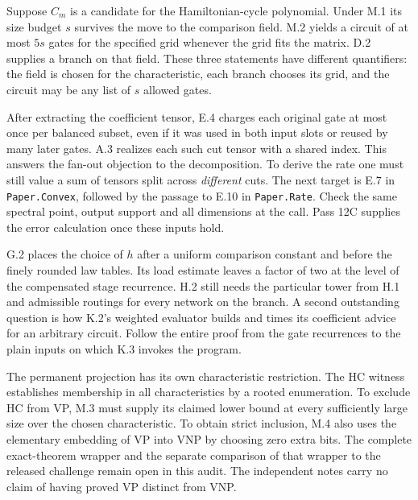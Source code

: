 \newpage
{}
Suppose $C_m$ is a candidate for the Hamiltonian-cycle polynomial. Under M.1 its size budget $s$ survives the move to the comparison field. M.2 yields a circuit of at most $5s$ gates for the specified grid whenever the grid fits the matrix. D.2 supplies a branch on that field. These three statements have different quantifiers: the field is chosen for the characteristic, each branch chooses its grid, and the circuit may be any list of $s$ allowed gates.

After extracting the coefficient tensor, E.4 charges each original gate at most once per balanced subset, even if it was used in both input slots or reused by many later gates. A.3 realizes each such cut tensor with a shared index. This answers the fan-out objection to the decomposition. To derive the rate one must still value a sum of tensors split across \emph{different} cuts. The next target is E.7 in \texttt{Paper.Convex}, followed by the passage to E.10 in \texttt{Paper.Rate}. Check the same spectral point, output support and all dimensions at the call. Pass 12C supplies the error calculation once these inputs hold.

G.2 places the choice of $h$ after a uniform comparison constant and before the finely rounded law tables. Its load estimate leaves a factor of two at the level of the compensated stage recurrence. H.2 still needs the particular tower from H.1 and admissible routings for every network on the branch. A second outstanding question is how K.2's weighted evaluator builds and times its coefficient advice for an arbitrary circuit. Follow the entire proof from the gate recurrences to the plain inputs on which K.3 invokes the program.

The permanent projection has its own characteristic restriction. The HC witness establishes membership in all characteristics by a rooted enumeration. To exclude HC from VP, M.3 must supply its claimed lower bound at every sufficiently large size over the chosen characteristic. To obtain strict inclusion, M.4 also uses the elementary embedding of VP into VNP by choosing zero extra bits. The complete exact-theorem wrapper and the separate comparison of that wrapper to the released challenge remain open in this audit. The independent notes carry no claim of having proved VP distinct from VNP.


